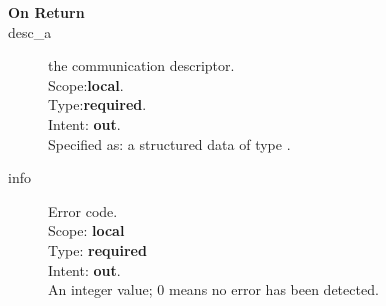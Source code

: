 \begin{description}
\item[\bf On Return]
\item[desc\_a] the communication descriptor.\\
Scope:{\bf local}.\\
Type:{\bf required}.\\
Intent: {\bf out}.\\
Specified as: a structured data of type \descdata.
\item[info] Error code.\\
Scope: {\bf local} \\
Type: {\bf required} \\
Intent: {\bf out}.\\
An integer value; 0 means no error has been detected. 
\end{description}


